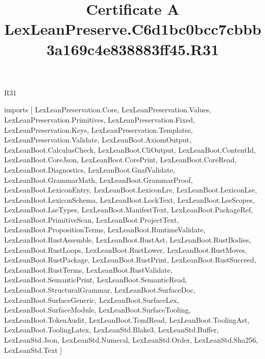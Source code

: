 \begin{lexlean}{R31}
\title{Certificate A LexLeanPreserve.C6d1bc0bcc7cbbb3a169c4e838883ff45.R31}
\begin{coremodule}
imports [
  LexLeanPreservation.Core,
  LexLeanPreservation.Values,
  LexLeanPreservation.Primitives,
  LexLeanPreservation.Fixed,
  LexLeanPreservation.Keys,
  LexLeanPreservation.Templates,
  LexLeanPreservation.Validate,
  LexLeanBoot.AxiomOutput,
  LexLeanBoot.CalculusCheck,
  LexLeanBoot.CliOutput,
  LexLeanBoot.ContentId,
  LexLeanBoot.CoreJson,
  LexLeanBoot.CorePrint,
  LexLeanBoot.CoreRead,
  LexLeanBoot.Diagnostics,
  LexLeanBoot.GnafValidate,
  LexLeanBoot.GrammarMath,
  LexLeanBoot.GrammarProof,
  LexLeanBoot.LexiconEntry,
  LexLeanBoot.LexiconLre,
  LexLeanBoot.LexiconLse,
  LexLeanBoot.LexiconSchema,
  LexLeanBoot.LockText,
  LexLeanBoot.LseScopes,
  LexLeanBoot.LseTypes,
  LexLeanBoot.ManifestText,
  LexLeanBoot.PackageRef,
  LexLeanBoot.PrimitiveScan,
  LexLeanBoot.ProjectText,
  LexLeanBoot.PropositionTerms,
  LexLeanBoot.RuntimeValidate,
  LexLeanBoot.RustAssemble,
  LexLeanBoot.RustAst,
  LexLeanBoot.RustBodies,
  LexLeanBoot.RustLoops,
  LexLeanBoot.RustLower,
  LexLeanBoot.RustMoves,
  LexLeanBoot.RustPackage,
  LexLeanBoot.RustPrint,
  LexLeanBoot.RustSucceed,
  LexLeanBoot.RustTerms,
  LexLeanBoot.RustValidate,
  LexLeanBoot.SemanticPrint,
  LexLeanBoot.SemanticRead,
  LexLeanBoot.StructuralGrammar,
  LexLeanBoot.SurfaceDoc,
  LexLeanBoot.SurfaceGeneric,
  LexLeanBoot.SurfaceLex,
  LexLeanBoot.SurfaceModule,
  LexLeanBoot.SurfaceTooling,
  LexLeanBoot.TokenAudit,
  LexLeanBoot.TomlRead,
  LexLeanBoot.ToolingAst,
  LexLeanBoot.ToolingLatex,
  LexLeanStd.Blake3,
  LexLeanStd.Buffer,
  LexLeanStd.Json,
  LexLeanStd.Numeral,
  LexLeanStd.Order,
  LexLeanStd.Sha256,
  LexLeanStd.Text
]


\end{coremodule}
\end{lexlean}
